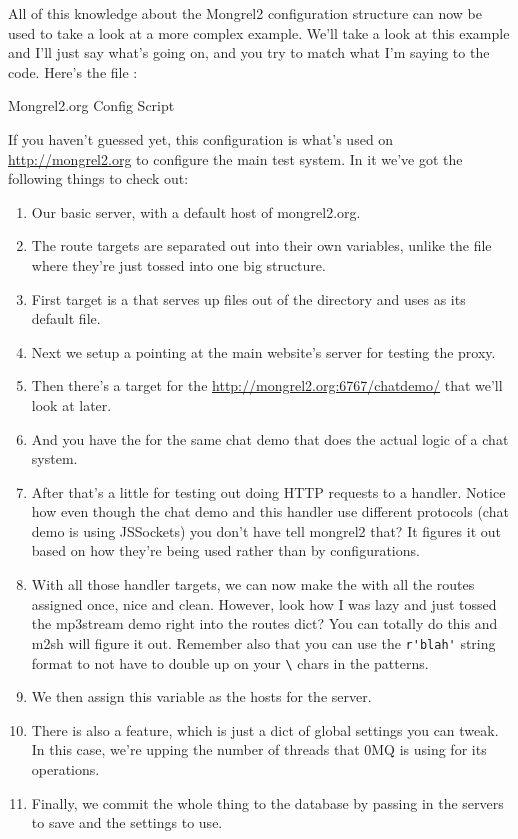 All of this knowledge about the Mongrel2 configuration structure can now be used to take a look at
a more complex example.  We'll take a look at this example and I'll just say what's
going on, and you try to match what I'm saying to the code.  Here's the file :

\begin{code}{Mongrel2.org Config Script}
  
\end{code}

If you haven't guessed yet, this configuration is what's used on \url{http://mongrel2.org}
to configure the main test system.  In it we've got the following things to check out:

\begin{enumerate}
\item Our basic server, with a default host of mongrel2.org.
\item The route targets are separated out into their own variables, unlike the  file
    where they're just tossed into one big structure.
\item First target is a  that serves up files out of the  directory and uses 
    as its default file.
\item Next we setup a  pointing at the main website's server for testing the proxy.
\item Then there's a  target for the \url{http://mongrel2.org:6767/chatdemo/} that we'll look at later.
\item And you have the  for the same chat demo that does the actual logic of a chat system.
\item After that's a little  for testing out doing HTTP requests to a handler.  Notice how even
    though the chat demo and this handler use different protocols (chat demo is using JSSockets) you don't have
    tell mongrel2 that?  It figures it out based on how they're being used rather than by configurations.
\item With all those handler targets, we can now make the   with all the routes
    assigned once, nice and clean.  However, look how I was lazy and just tossed the mp3stream demo
    right into the routes dict?  You can totally do this and m2sh will figure it out.  Remember also that
    you can use the \verb|r'blah'| string format to not have to double up on your \verb|\| chars in the patterns.
\item We then assign this  variable as the hosts for the  server.
\item There is also a  feature, which is just a dict of global settings you can tweak.  In this case,
    we're upping the number of threads that 0MQ is using for its operations.
\item Finally, we commit the whole thing to the database by passing in the servers to save and the settings
    to use.
\end{enumerate}

